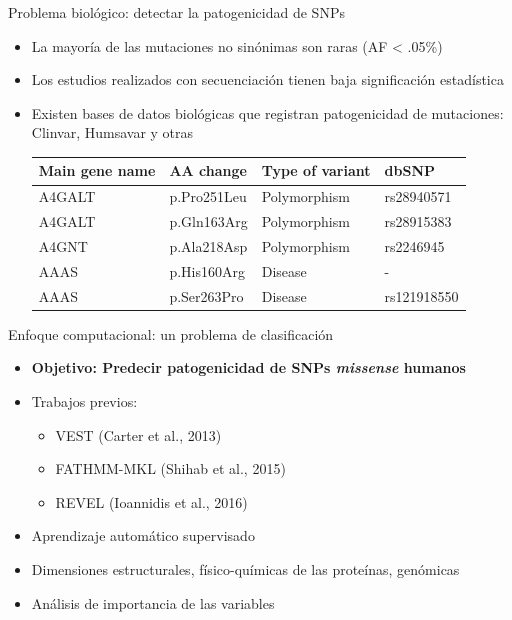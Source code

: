 \documentclass[
  spanish,
  ignorenonframetext,
]{beamer}
\providecommand{\tightlist}{%
  \setlength{\itemsep}{0pt}\setlength{\parskip}{0pt}}
\begin{document}
\begin{frame}{Problema biológico: detectar la patogenicidad de SNPs}
\protect\hypertarget{problema-bioluxf3gico-detectar-la-patogenicidad-de-snps}{}

\begin{itemize}
\item
  La mayoría de las mutaciones no sinónimas son raras (AF \textless{}
  .05\%)
\item
  Los estudios realizados con secuenciación tienen baja significación
  estadística
\item
  Existen bases de datos biológicas que registran patogenicidad de
  mutaciones: Clinvar, Humsavar y otras

  \begin{longtable}[]{@{}llll@{}}
  \toprule
  Main gene name & AA change & Type of variant & dbSNP\tabularnewline
  \midrule
  \endhead
  A4GALT & p.Pro251Leu & Polymorphism & rs28940571\tabularnewline
  A4GALT & p.Gln163Arg & Polymorphism & rs28915383\tabularnewline
  A4GNT & p.Ala218Asp & Polymorphism & rs2246945\tabularnewline
  AAAS & p.His160Arg & Disease & -\tabularnewline
  AAAS & p.Ser263Pro & Disease & rs121918550\tabularnewline
  \bottomrule
  \end{longtable}

\end{itemize}

\end{frame}

\begin{frame}{Enfoque computacional: un problema de clasificación}
\protect\hypertarget{enfoque-computacional-un-problema-de-clasificaciuxf3n}{}

\begin{itemize}
\item
  \textbf{Objetivo: Predecir patogenicidad de SNPs \textit{missense}
  humanos}
\item
  Trabajos previos:

  \begin{itemize}
  \tightlist
  \item
    VEST (Carter et al., 2013)\\
  \item
    FATHMM-MKL (Shihab et al., 2015)
  \item
    REVEL (Ioannidis et al., 2016)
  \end{itemize}
\item
  Aprendizaje automático supervisado
\item
  Dimensiones estructurales, físico-químicas de las proteínas, genómicas
\item
  Análisis de importancia de las variables
\end{itemize}

\end{frame}
\end{document}
